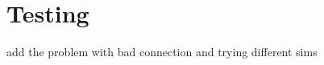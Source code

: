 \chapter{Testing}\label{ch:testing}


add the problem with bad connection and trying different sims
